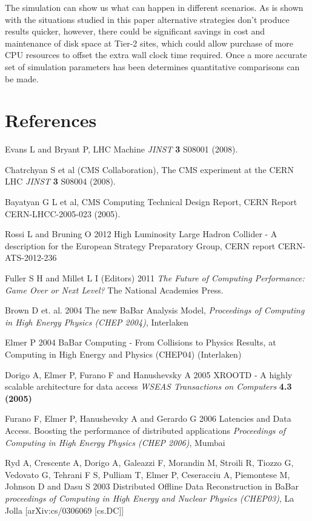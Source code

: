 \documentclass[a4paper]{jpconf}
\begin{document}
The simulation can show us what can happen in different scenarios. As
is shown with the situations studied in this paper alternative
strategies don't produce results quicker, however, there could be
significant savings in cost and maintenance of disk space at Tier-2
sites, which could allow purchase of more CPU resources to offset the
extra wall clock time required. Once a more accurate set of simulation
parameters has been determines quantitative comparisons can be made.

\section*{References}
\begin{thebibliography}{9}
 Evans L and Bryant P,  LHC Machine {\it JINST}
  {\bf 3} S08001 (2008).

 Chatrchyan S et al (CMS Collaboration),  The CMS
  experiment at the CERN LHC {\it JINST} {\bf 3} S08004 (2008).

 Bayatyan G L et al,  CMS Computing Technical Design
  Report, CERN Report CERN-LHCC-2005-023 (2005).

 Rossi L and Bruning O 2012 High Luminosity Large Hadron
  Collider - A description for the European Strategy Preparatory
  Group, CERN report CERN-ATS-2012-236

 Fuller S H and Millet L I (Editors) 2011 {\it The
  Future of Computing Performance:  Game Over or Next Level?}
  The National Academies Press.

 Brown D et. al. 2004 The new BaBar Analysis
  Model, {\it Proceedings of Computing in High Energy Physics (CHEP
    2004)}, Interlaken 

 Elmer P 2004 BaBar Computing - From Collisions to
  Physics Results, at Computing in High Energy and Physics (CHEP04)
  (Interlaken)

 Dorigo A, Elmer P, Furano F and Hanushevsky A 2005
  XROOTD - A highly scalable architecture for data access {\it WSEAS
    Transactions on Computers} {\bf 4.3 (2005)}

 Furano F, Elmer P, Hanushevsky A and Gerardo G 2006
  Latencies and Data Access. Boosting the performance of distributed
  applications {\it Proceedings of Computing in High Energy Physics
    (CHEP 2006)}, Mumbai

 Ryd A, Crescente A, Dorigo A, Galeazzi F, Morandin
  M, Stroili R, Tiozzo G, Vedovato G, Tehrani F S, Pulliam T, Elmer P,
  Ceseracciu A, Piemontese M, Johnson D and Dasu S 2003 Distributed
  Offline Data Reconstruction in BaBar {\it proceedings of Computing
    in High Energy and Nuclear Physics (CHEP03)}, La Jolla
  [arXiv:cs/0306069 [cs.DC]]


\end{thebibliography}
\end{document}
